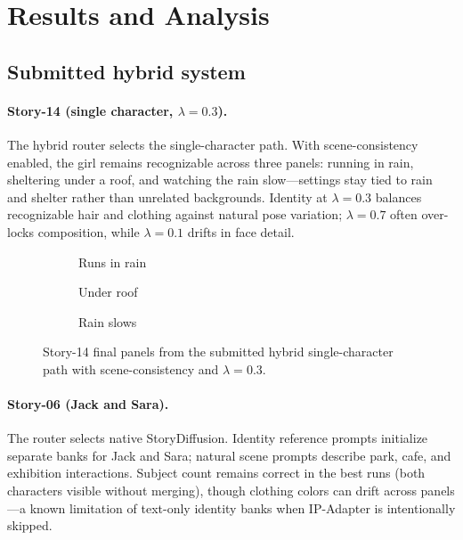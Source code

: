 \section{Results and Analysis}
\label{sec:results}

\subsection{Submitted hybrid system}

\paragraph{Story-14 (single character, $\lambda=0.3$).}
The hybrid router selects the single-character path.
With scene-consistency enabled, the girl remains recognizable across three panels: running in rain, sheltering under a roof, and watching the rain slow---settings stay tied to rain and shelter rather than unrelated backgrounds.
Identity at $\lambda=0.3$ balances recognizable hair and clothing against natural pose variation; $\lambda=0.7$ often over-locks composition, while $\lambda=0.1$ drifts in face detail.

\begin{figure}[!t]
  \centering
  \begin{subfigure}{0.31\textwidth}
    \centering
    \caption{Runs in rain}
  \end{subfigure}
  \hfill
  \begin{subfigure}{0.31\textwidth}
    \centering
    \caption{Under roof}
  \end{subfigure}
  \hfill
  \begin{subfigure}{0.31\textwidth}
    \centering
    \caption{Rain slows}
  \end{subfigure}
  \caption{Story-14 final panels from the submitted hybrid single-character path with scene-consistency and $\lambda=0.3$.}
  \label{fig:story14}
\end{figure}

\paragraph{Story-06 (Jack and Sara).}
The router selects native StoryDiffusion.
Identity reference prompts initialize separate banks for Jack and Sara; natural scene prompts describe park, cafe, and exhibition interactions.
Subject count remains correct in the best runs (both characters visible without merging), though clothing colors can drift across panels---a known limitation of text-only identity banks when IP-Adapter is intentionally skipped.

